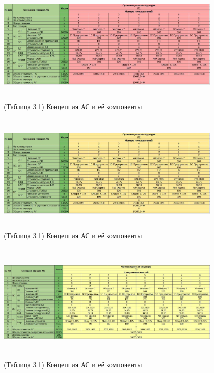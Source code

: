 \documentclass[12pt, a4paper, simple]{eskdtext}
\begin{document}
    \newpage

    \begin{figure}[!hp]
        \centering
        \includegraphics[height=6cm]
            {_docs/КонцепцияАСИЕеКомпонентыП1.jpg}
        \caption{(Таблица 3.1) Концепция АС и её компоненты}
    \end{figure}

    \begin{figure}[!hp]
        \centering
        \includegraphics[height=6cm]
            {_docs/КонцепцияАСИЕеКомпонентыП2.jpg}
        \caption{(Таблица 3.1) Концепция АС и её компоненты}
    \end{figure}

    \begin{figure}[!hp]
        \centering
        \includegraphics[height=6cm]
            {_docs/КонцепцияАСИЕеКомпонентыП3.jpg}
        \caption{(Таблица 3.1) Концепция АС и её компоненты}
    \end{figure}
\end{document}
